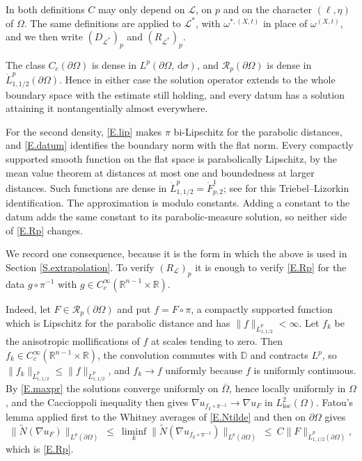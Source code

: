 \documentclass[10pt,a4paper]{amsart}
\numberwithin{equation}{section}
\DeclareMathOperator{\loc}{loc}
\newcommand{\R}{\mathbb R}
\newcommand{\om}{\Omega}
\newcommand{\pom}{\partial\Omega}
\newcommand{\Dpar}{\mathbb D}
\newcommand{\LL}{\mathcal L}
\newcommand{\Nt}{\widetilde N}
\renewcommand{\d}{\,\mathrm d}
\begin{document}
\noindent In both definitions $C$ may only depend on $\LL$, on $p$ and on the
character $(\ell,\eta)$ of $\om$. The same definitions are
applied to $\LL^*$, with $\omega^{*,(X,t)}$ in place of $\omega^{(X,t)}$, and we
then write $(D_{\LL^*})_p$ and $(R_{\LL^*})_p$.\medskip

\noindent The class $C_c(\pom)$ is dense in $L^p(\pom,\d\sigma)$, and
$\mathcal R_p(\pom)$ is dense in $\dot L^p_{1,1/2}(\pom)$. Hence in either case
the solution operator extends to the whole boundary space with the estimate
still holding, and every datum has a solution attaining it nontangentially
almost everywhere.

\noindent For the second density, \eqref{E.lip} makes $\pi$ bi-Lipschitz
for the parabolic distances, and \eqref{E.datum} identifies the boundary
norm with the flat norm. Every compactly supported smooth function on the
flat space is parabolically Lipschitz, by the mean value theorem at distances
at most one and boundedness at larger distances. Such functions are dense
in $\dot L^p_{1,1/2}=\dot F^1_{p,2}$; see \cite[\S2.3]{DN} for this
Triebel--Lizorkin identification. The approximation is modulo constants.
Adding a constant to the datum adds the same constant to its
parabolic-measure solution, so neither side of \eqref{E.Rp} changes.

\noindent We record one consequence, because it is the form in which the
above is used in Section \ref{S.extrapolation}. To verify $(R_\LL)_p$ it is
enough to verify \eqref{E.Rp} for the data $g\circ\pi^{-1}$ with
$g\in C^\infty_c(\R^{n-1}\times\R)$.

\noindent Indeed, let $F\in\mathcal R_p(\pom)$ and put $f=F\circ\pi$, a
compactly supported function which is Lipschitz for the parabolic distance and
has $\|f\|_{\dot L^p_{1,1/2}}<\infty$. Let $f_k$ be the anisotropic
mollifications of $f$ at scales tending to zero. Then $f_k\in
C^\infty_c(\R^{n-1}\times\R)$, the convolution commutes with $\Dpar$ and
contracts $L^p$, so $\|f_k\|_{\dot L^p_{1,1/2}}\le\|f\|_{\dot
L^p_{1,1/2}}$, and $f_k\to f$ uniformly because $f$ is uniformly continuous.
By \eqref{E.maxpr} the solutions converge uniformly on $\overline\om$, hence
locally uniformly in $\om$, and the Caccioppoli inequality then gives
$\nabla u_{f_k\circ\pi^{-1}}\to\nabla u_F$ in $L^2_{\loc}(\om)$. Fatou's
lemma applied first to the Whitney averages of \eqref{E.Ntilde} and then on
$\pom$ gives
$$\big\|\Nt(\nabla u_F)\big\|_{L^p(\pom)}\ \le\
  \liminf_k\big\|\Nt(\nabla u_{f_k\circ\pi^{-1}})\big\|_{L^p(\pom)}
  \ \le\ C\|F\|_{\dot L^p_{1,1/2}(\pom)} ,$$
which is \eqref{E.Rp}.
\end{document}
